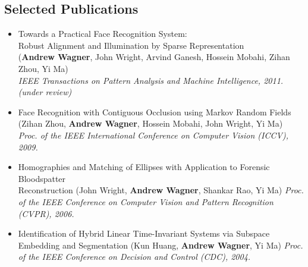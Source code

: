 \documentclass[line,lm,rm]{res}
\def\spaceline{\vspace{1mm} \fullline}
\begin{document}
\begin{resume}
\section{Selected Publications}
\begin{itemize}
\item 
\spaceline
Towards a Practical Face Recognition System: \\Robust Alignment and Illumination by Sparse Representation \\
		({\bf Andrew Wagner}, John Wright, Arvind Ganesh, Hossein Mobahi, Zihan Zhou, Yi Ma) \\
{ \it IEEE Transactions on Pattern Analysis and Machine Intelligence, 2011. (under review) }
\item
		Face Recognition with Contiguous Occlusion using Markov Random Fields \\
			(Zihan Zhou, {\bf Andrew Wagner}, Hossein Mobahi, John Wright, Yi Ma) \\
{\it Proc. of the IEEE International Conference on Computer Vision (ICCV), 2009.}
\item Homographies and Matching of Ellipses with Application to Forensic Bloodspatter \\
	Reconstruction 
(John Wright, {\bf Andrew Wagner}, {Shankar Rao},  Yi Ma) 
{\it Proc. of the IEEE Conference on Computer Vision and Pattern Recognition (CVPR), 2006.}
\item Identification of Hybrid Linear Time-Invariant Systems via Subspace Embedding and Segmentation (Kun Huang, {\bf Andrew Wagner}, Yi Ma) {\it Proc. of the IEEE Conference on Decision and Control (CDC), 2004.}
\end{itemize}
\vspace{-0.2in}

\end{resume}
\end{document}
